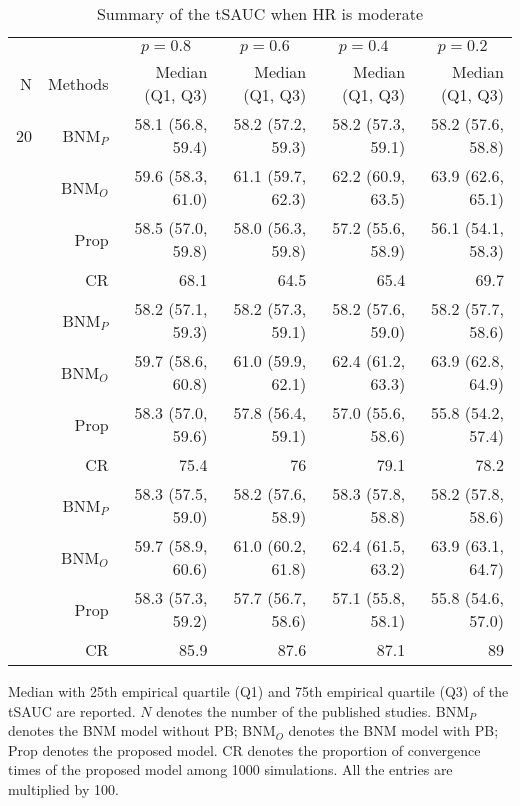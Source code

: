 \begin{table}[!htb]

\caption{\label{tab:sauc.med.2}Summary of the tSAUC when HR is moderate}
\centering
\begin{threeparttable}
\begin{tabular}[t]{rrrrrr}
\toprule
\multicolumn{1}{c}{} & \multicolumn{1}{c}{} & \multicolumn{1}{c}{$p = 0.8$} & \multicolumn{1}{c}{$p = 0.6$} & \multicolumn{1}{c}{$p = 0.4$} & \multicolumn{1}{c}{$p = 0.2$} \\
\cmidrule(l{3pt}r{3pt}){3-3} \cmidrule(l{3pt}r{3pt}){4-4} \cmidrule(l{3pt}r{3pt}){5-5} \cmidrule(l{3pt}r{3pt}){6-6}
N & Methods & Median (Q1, Q3) & Median (Q1, Q3) & Median (Q1, Q3) & Median (Q1, Q3)\\
\midrule
20 & BNM$_P$ & 58.1 (56.8, 59.4) & 58.2 (57.2, 59.3) & 58.2 (57.3, 59.1) & 58.2 (57.6, 58.8)\\
 & BNM$_O$ & 59.6 (58.3, 61.0) & 61.1 (59.7, 62.3) & 62.2 (60.9, 63.5) & 63.9 (62.6, 65.1)\\
 & Prop & 58.5 (57.0, 59.8) & 58.0 (56.3, 59.8) & 57.2 (55.6, 58.9) & 56.1 (54.1, 58.3)\\
 & CR & 68.1 & 64.5 & 65.4 & 69.7\\
\addlinespace
30 & BNM$_P$ & 58.2 (57.1, 59.3) & 58.2 (57.3, 59.1) & 58.2 (57.6, 59.0) & 58.2 (57.7, 58.6)\\
 & BNM$_O$ & 59.7 (58.6, 60.8) & 61.0 (59.9, 62.1) & 62.4 (61.2, 63.3) & 63.9 (62.8, 64.9)\\
 & Prop & 58.3 (57.0, 59.6) & 57.8 (56.4, 59.1) & 57.0 (55.6, 58.6) & 55.8 (54.2, 57.4)\\
 & CR & 75.4 & 76 & 79.1 & 78.2\\
\addlinespace
50 & BNM$_P$ & 58.3 (57.5, 59.0) & 58.2 (57.6, 58.9) & 58.3 (57.8, 58.8) & 58.2 (57.8, 58.6)\\
 & BNM$_O$ & 59.7 (58.9, 60.6) & 61.0 (60.2, 61.8) & 62.4 (61.5, 63.2) & 63.9 (63.1, 64.7)\\
 & Prop & 58.3 (57.3, 59.2) & 57.7 (56.7, 58.6) & 57.1 (55.8, 58.1) & 55.8 (54.6, 57.0)\\
 & CR & 85.9 & 87.6 & 87.1 & 89\\
\bottomrule
\end{tabular}
\begin{tablenotes}
\item 
Median with 25th empirical quartile (Q1) and 75th empirical quartile (Q3) of the tSAUC are reported. 
$N$ denotes the number of the published studies. 
BNM$_P$ denotes the BNM model without PB; 
BNM$_O$ denotes the BNM model with PB;
Prop denotes the proposed model.
CR denotes the proportion of convergence times of the proposed model among 1000 simulations.
All the entries are multiplied by 100.
\end{tablenotes}
\end{threeparttable}
\end{table}
